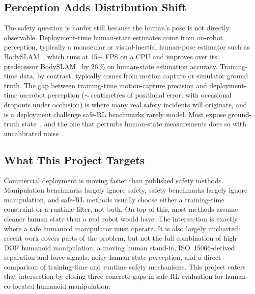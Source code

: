 \documentclass[11pt,a4paper]{report}
\newcommand{\iso}{ISO~15066}
\newcommand{\bodyslampp}{BodySLAM\nolinebreak[4]\hspace{-.05em}\raisebox{.2ex}{\scriptsize ++}}
\begin{document}
\subsection{Perception Adds Distribution Shift}
\label{sec:intro:mot:perception}

The safety question is harder still because the human's pose is not
directly observable. Deployment-time human-state estimates come from
on-robot perception, typically a monocular or visual-inertial
human-pose estimator such as \bodyslampp{}~\cite{henning2023bodyslampp},
which runs at 15+ FPS on a CPU and improves over its predecessor
BodySLAM~\cite{henning2022bodyslam} by 26\,\% on human-state
estimation accuracy. Training-time data, by contrast, typically
comes from motion capture or simulator ground truth.
The gap between training-time motion-capture precision and
deployment-time on-robot perception ($\sim$\,centimetres of
positional error, with occasional dropouts under occlusion) is where
many real safety incidents will originate, and is a deployment
challenge safe-RL benchmarks rarely model. Most expose ground-truth
state~\cite{ray2019safetygym,ji2023safetygymnasium,yuan2022safecontrolgym},
and the one that perturbs human-state measurements does so with
uncalibrated noise~\cite{thumm2024humanrobotgym}.

\subsection{What This Project Targets}
\label{sec:intro:mot:targets}

Commercial deployment is moving faster than published safety methods. Manipulation
benchmarks largely ignore safety, safety benchmarks largely ignore
manipulation, and safe-RL methods usually choose either a
training-time constraint or a runtime filter, not both. On top of
this, most methods assume cleaner human state than a real robot would
have. The intersection is exactly where a safe humanoid manipulator
must operate. It is also largely uncharted: recent work covers parts of
the problem, but not the full combination of high-DOF humanoid
manipulation, a moving human stand-in, \iso{}-derived separation and
force signals, noisy human-state perception, and a direct comparison of
training-time and runtime safety mechanisms. This project enters that
intersection by closing three concrete gaps in safe-RL evaluation for
human-co-located humanoid manipulation:
\end{document}
